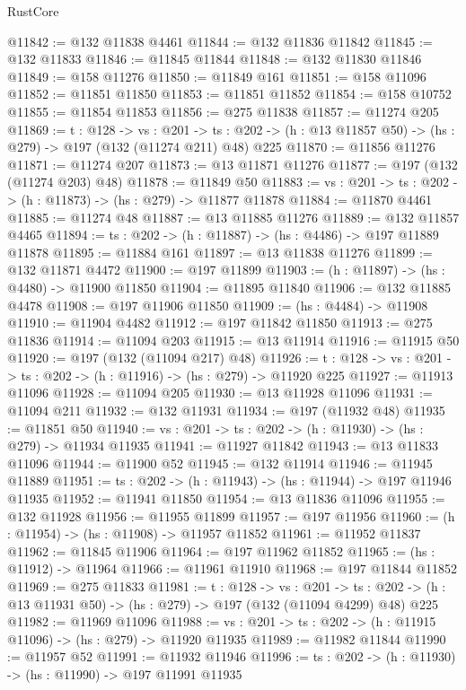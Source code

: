 \begin{lexlean}{RustCore}
\begin{coremodule}
@11842 := @132 @11838 @4461
@11844 := @132 @11836 @11842
@11845 := @132 @11833
@11846 := @11845 @11844
@11848 := @132 @11830 @11846
@11849 := @158 @11276
@11850 := @11849 @161
@11851 := @158 @11096
@11852 := @11851 @11850
@11853 := @11851 @11852
@11854 := @158 @10752
@11855 := @11854 @11853
@11856 := @275 @11838
@11857 := @11274 @205
@11869 := {t : @128} ->
  {vs : @201} ->
  {ts : @202} -> (h : @13 @11857 @50) -> (hs : @279) -> @197 (@132 (@11274 @211) @48) @225
@11870 := @11856 @11276
@11871 := @11274 @207
@11873 := @13 @11871 @11276
@11877 := @197 (@132 (@11274 @203) @48)
@11878 := @11849 @50
@11883 := {vs : @201} -> {ts : @202} -> (h : @11873) -> (hs : @279) -> @11877 @11878
@11884 := @11870 @4461
@11885 := @11274 @48
@11887 := @13 @11885 @11276
@11889 := @132 @11857 @4465
@11894 := {ts : @202} -> (h : @11887) -> (hs : @4486) -> @197 @11889 @11878
@11895 := @11884 @161
@11897 := @13 @11838 @11276
@11899 := @132 @11871 @4472
@11900 := @197 @11899
@11903 := (h : @11897) -> (hs : @4480) -> @11900 @11850
@11904 := @11895 @11840
@11906 := @132 @11885 @4478
@11908 := @197 @11906 @11850
@11909 := (hs : @4484) -> @11908
@11910 := @11904 @4482
@11912 := @197 @11842 @11850
@11913 := @275 @11836
@11914 := @11094 @203
@11915 := @13 @11914
@11916 := @11915 @50
@11920 := @197 (@132 (@11094 @217) @48)
@11926 := {t : @128} -> {vs : @201} -> {ts : @202} -> (h : @11916) -> (hs : @279) -> @11920 @225
@11927 := @11913 @11096
@11928 := @11094 @205
@11930 := @13 @11928 @11096
@11931 := @11094 @211
@11932 := @132 @11931
@11934 := @197 (@11932 @48)
@11935 := @11851 @50
@11940 := {vs : @201} -> {ts : @202} -> (h : @11930) -> (hs : @279) -> @11934 @11935
@11941 := @11927 @11842
@11943 := @13 @11833 @11096
@11944 := @11900 @52
@11945 := @132 @11914
@11946 := @11945 @11889
@11951 := {ts : @202} -> (h : @11943) -> (hs : @11944) -> @197 @11946 @11935
@11952 := @11941 @11850
@11954 := @13 @11836 @11096
@11955 := @132 @11928
@11956 := @11955 @11899
@11957 := @197 @11956
@11960 := (h : @11954) -> (hs : @11908) -> @11957 @11852
@11961 := @11952 @11837
@11962 := @11845 @11906
@11964 := @197 @11962 @11852
@11965 := (hs : @11912) -> @11964
@11966 := @11961 @11910
@11968 := @197 @11844 @11852
@11969 := @275 @11833
@11981 := {t : @128} ->
  {vs : @201} ->
  {ts : @202} -> (h : @13 @11931 @50) -> (hs : @279) -> @197 (@132 (@11094 @4299) @48) @225
@11982 := @11969 @11096
@11988 := {vs : @201} -> {ts : @202} -> (h : @11915 @11096) -> (hs : @279) -> @11920 @11935
@11989 := @11982 @11844
@11990 := @11957 @52
@11991 := @11932 @11946
@11996 := {ts : @202} -> (h : @11930) -> (hs : @11990) -> @197 @11991 @11935

\end{coremodule}
\end{lexlean}
